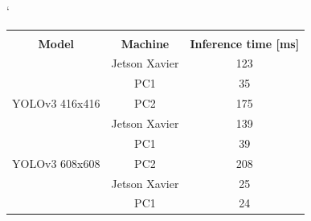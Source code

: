 \documentclass[twoside]{ctuthesis}
\theoremstyle{plain}
\theoremstyle{definition}
\theoremstyle{note}
\begin{document}
\begin{table}[H]
\catcode`
\begin{tabular}{|c|c|c|}
\hline
\cellcolor[HTML]{C0C0C0}                                 & \cellcolor[HTML]{C0C0C0}                                   & \cellcolor[HTML]{C0C0C0}                                                   \\
\multirow{-2}{*}{\cellcolor[HTML]{C0C0C0}\textbf{Model}} & \multirow{-2}{*}{\cellcolor[HTML]{C0C0C0}\textbf{Machine}} & \multirow{-2}{*}{\cellcolor[HTML]{C0C0C0}\textbf{Inference time {[}ms{]}}} \\ \hline
                                                         & Jetson Xavier                                              & 123                                                                        \\ \cline{2-3} 
                                                         & PC1                                                        & 35                                                                         \\ \cline{2-3} 
\multirow{-3}{*}{YOLOv3 416x416}                         & PC2                                                        & 175                                                                        \\ \hline
                                                         & Jetson Xavier                                              & 139                                                                        \\ \cline{2-3} 
                                                         & PC1                                                        & 39                                                                         \\ \cline{2-3} 
\multirow{-3}{*}{YOLOv3 608x608}                         & PC2                                                        & 208                                                                        \\ \hline
                                                         & Jetson Xavier                                              & 25                                                                         \\ \cline{2-3} 
                                                         & PC1                                                        & 24                                                                         \\ \cline{2-3} 

\end{tabular}
\end{table}
\end{document}

